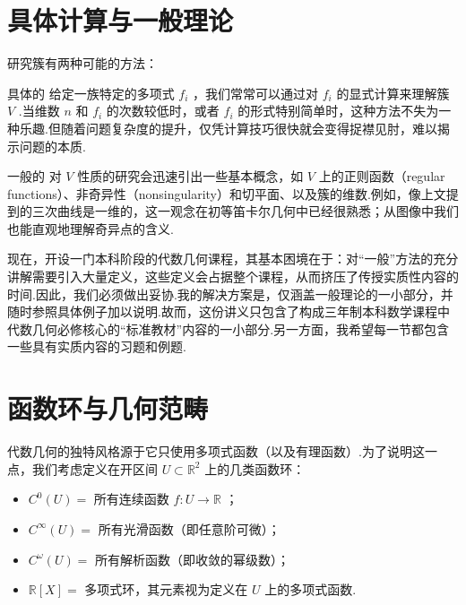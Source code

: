 \section{具体计算与一般理论}

研究簇有两种可能的方法：

具体的 给定一族特定的多项式 \({f}_{i}\) ，我们常常可以通过对 \({f}_{i}\) 的显式计算来理解簇 \(V\) .当维数 \(n\) 和 \({f}_{i}\) 的次数较低时，或者 \({f}_{i}\) 的形式特别简单时，这种方法不失为一种乐趣.但随着问题复杂度的提升，仅凭计算技巧很快就会变得捉襟见肘，难以揭示问题的本质.

一般的 对 \(V\) 性质的研究会迅速引出一些基本概念，如 \(V\) 上的正则函数（regular functions）、非奇异性（nonsingularity）和切平面、以及簇的维数.例如，像上文提到的三次曲线是一维的，这一观念在初等笛卡尔几何中已经很熟悉；从图像中我们也能直观地理解奇异点的含义.

现在，开设一门本科阶段的代数几何课程，其基本困境在于：对“一般”方法的充分讲解需要引入大量定义，这些定义会占据整个课程，从而挤压了传授实质性内容的时间.因此，我们必须做出妥协.我的解决方案是，仅涵盖一般理论的一小部分，并随时参照具体例子加以说明.故而，这份讲义只包含了构成三年制本科数学课程中代数几何必修核心的“标准教材”内容的一小部分.另一方面，我希望每一节都包含一些具有实质内容的习题和例题.

\section{函数环与几何范畴}

代数几何的独特风格源于它只使用多项式函数（以及有理函数）.为了说明这一点，我们考虑定义在开区间 \(U \subset  {\mathbb{R}}^{2}\) 上的几类函数环：

\begin{itemize}
\item \({C}^{0}\left( U\right)  =\) 所有连续函数 \(f : U \rightarrow  \mathbb{R}\) ；
\end{itemize}

\begin{itemize}
\item \({C}^{\infty }\left( U\right)  =\) 所有光滑函数（即任意阶可微）；
\end{itemize}

\begin{itemize}
\item \({C}^{\omega }\left( U\right)  =\) 所有解析函数（即收敛的幂级数）；
\end{itemize}

\begin{itemize}
\item \(\mathbb{R}\left\lbrack  X\right\rbrack   =\) 多项式环，其元素视为定义在 \(U\) 上的多项式函数.
\end{itemize}

